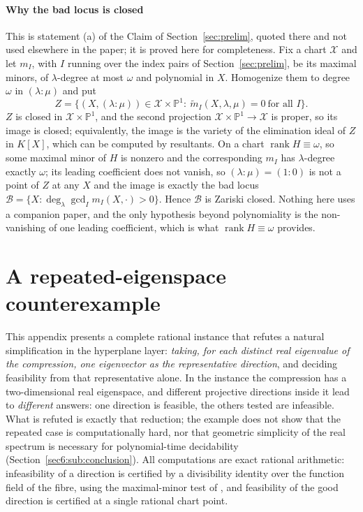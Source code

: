 \documentclass[journal]{IEEEtran}
\theoremstyle{plainn}
\theoremstyle{remark}
\newcommand{\rank}{\operatorname{rank}}
\begin{document}
\paragraph{Why the bad locus is closed}\label{appBC:sub:closed}
This is statement (a) of the Claim of Section~\ref{sec:prelim}, quoted there and not used elsewhere in the
paper; it is proved here for completeness. Fix a chart $\mathcal X$ and let $m_I$, with $I$ running over
the index pairs of Section~\ref{sec:prelim}, be its maximal minors, of $\lambda$-degree at most $\omega$ and
polynomial in $X$. Homogenize them to degree $\omega$ in
$(\lambda:\mu)$ and put
\[
Z=\bigl\{(X,(\lambda:\mu))\in\mathcal X\times\mathbb P^1:\ \tilde m_I(X,\lambda,\mu)=0\ \text{for all }I\bigr\}.
\]
$Z$ is closed in $\mathcal X\times\mathbb P^1$, and the second projection $\mathcal X\times\mathbb P^1\to
\mathcal X$ is proper, so its image is closed; equivalently, the image is the variety of the elimination
ideal of $Z$ in $K[X]$, which can be computed by resultants. On a chart $\rank H\equiv\omega$, so some
maximal minor of $H$ is nonzero and the corresponding $m_I$ has $\lambda$-degree exactly $\omega$; its
leading coefficient does not vanish, so $(\lambda:\mu)=(1:0)$ is not a point of $Z$ at any $X$ and the
image is exactly the bad locus $\mathcal B=\{X:\deg_\lambda\gcd_I m_I(X,\cdot)>0\}$. Hence $\mathcal B$ is
Zariski closed. Nothing here uses a companion paper, and the only hypothesis beyond polynomiality is the
non-vanishing of one leading coefficient, which is what $\rank H\equiv\omega$ provides.


\section{A repeated-eigenspace counterexample}\label{app:example}\label{sec:counterexample}\label{appA}\label{app:data}

This appendix presents a complete rational instance that refutes a natural simplification in the
hyperplane layer: \emph{taking, for each distinct real eigenvalue of the compression, one eigenvector as
the representative direction}, and deciding feasibility from that representative alone. In the instance
the compression has a two-dimensional real eigenspace, and different projective directions inside it
lead to \emph{different} answers: one direction is feasible, the others tested are infeasible. What is
refuted is exactly that reduction; the example does not show that the repeated case is computationally
hard, nor that geometric simplicity of the real spectrum is necessary for polynomial-time decidability
(Section~\ref{sec6:sub:conclusion}). All computations are exact rational arithmetic: infeasibility of a
direction is certified by a divisibility identity over the function field of the fibre, using the
maximal-minor test of \cite{companion1}, and feasibility of the good direction is certified at a single
rational chart point.
\end{document}
